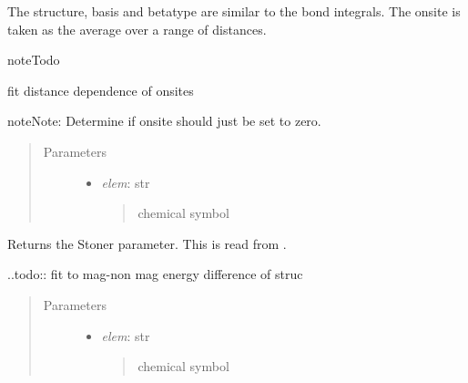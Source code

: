 \documentclass[letterpaper,10pt,english]{sphinxmanual}
\begin{document}
\begin{fulllineitems}
\begin{fulllineitems}
The structure, basis and betatype are similar to the bond integrals.
The onsite is taken as the average over a range of distances.

\begin{notice}{note}{Todo}

fit distance dependence of onsites
\end{notice}

\begin{notice}{note}{Note:}
Determine if onsite should just be set to zero.
\end{notice}
\begin{quote}\begin{description}
\item[{Parameters}] \leavevmode\begin{itemize}
\item {} 
\emph{elem}: str
\begin{quote}

chemical symbol
\end{quote}

\end{itemize}

\end{description}\end{quote}

\end{fulllineitems}


\begin{fulllineitems}
\label{classes:catparam.CATParam.gen_stoner}
Returns the Stoner parameter. This is read from 
.

..todo:: fit to mag-non mag energy difference of struc
\begin{quote}\begin{description}
\item[{Parameters}] \leavevmode\begin{itemize}
\item {} 
\emph{elem}: str
\begin{quote}

chemical symbol
\end{quote}

\end{itemize}

\end{description}\end{quote}


\end{fulllineitems}
\end{fulllineitems}
\end{document}
